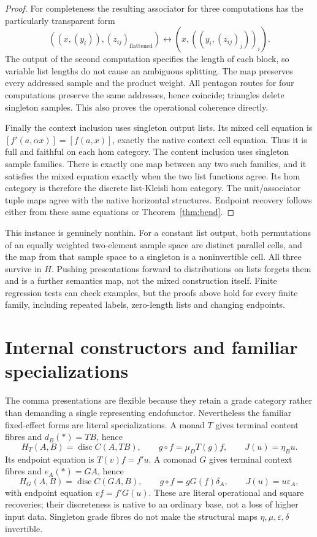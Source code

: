 \documentclass[11pt]{article}
\theoremstyle{definition}
\newcommand{\disc}{\operatorname{disc}}
\begin{document}
\begin{proof}
For completeness the resulting associator for three computations has the
particularly transparent form
\begin{equation}\label{eq:probassoc}
 ((x,(y_i)),(z_{ij})_{\mathrm{flattened}})
 \longleftrightarrow
 (x,((y_i,(z_{ij})_j))_i).
\end{equation}
The output of the second computation specifies the length of each block,
so variable list lengths do not cause an ambiguous splitting. The map
preserves every addressed sample and the product weight. All pentagon
routes for four computations preserve the same addresses, hence coincide;
triangles delete singleton samples. This also proves the operational
coherence directly.

Finally the context inclusion uses singleton output lists. Its mixed
cell equation is $[f'(a,\alpha x)]=[f(a,x)]$, exactly the native context
cell equation. Thus it is full and faithful on each hom category.
The content inclusion uses singleton sample families. There is exactly one
map between any two such families, and it satisfies the mixed equation
exactly when the two list functions agree. Its hom category is therefore
the discrete list-Kleisli hom category. The unit/associator tuple maps agree
with the native horizontal structures. Endpoint recovery follows either
from these same equations or Theorem~\ref{thm:bend}.
\end{proof}

This instance is genuinely nonthin. For a constant list output, both
permutations of an equally weighted two-element sample space are distinct
parallel cells, and the map from that sample space to a singleton is a
noninvertible cell. All three survive in $H$. Pushing presentations forward
to distributions on lists forgets them and is a further semantics map, not
the mixed construction itself. Finite regression tests can check examples,
but the proofs above hold for every finite family, including repeated
labels, zero-length lists and changing endpoints.

\section{Internal constructors and familiar specializations}\label{sec:constructors}

The comma presentations are flexible because they retain a grade category
rather than demanding a single representing endofunctor. Nevertheless the
familiar fixed-effect forms are literal specializations. A monad $T$ gives
terminal content fibres and $d_B(*)=TB$, hence
\[
 H_T(A,B)=\disc C(A,TB),\qquad g\circ f=\mu_D T(g)f,
 \qquad J(u)=\eta_Bu.
\]
Its endpoint equation is $T(v)f=f'u$. A comonad $G$ gives terminal context
fibres and $e_A(*)=GA$, hence
\[
 H_G(A,B)=\disc C(GA,B),\qquad g\circ f=gG(f)\delta_A,
 \qquad J(u)=u\varepsilon_A,
\]
with endpoint equation $vf=f'G(u)$. These are literal operational and square
recoveries; their discreteness is native to an ordinary base, not a loss of
higher input data. Singleton grade fibres do not make the structural maps
$\eta,\mu,\varepsilon,\delta$ invertible.
\end{document}
